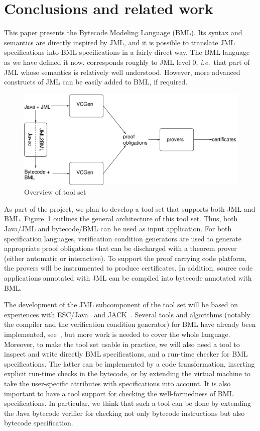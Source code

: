 \section{Conclusions and related work}\label{SecConcl}

This paper presents the Bytecode Modeling Language (BML). Its syntax
and semantics are directly inspired by JML, and it is possible to
translate JML specifications into BML specifications in a fairly
direct way. The BML language as we have defined it now, corresponds
roughly to JML level 0, \emph{i.e.}\ that part of JML whose semantics
is relatively well understood. However, more advanced constructs of
JML can be easily added to BML, if required. 

\begin{figure}[t]
\includegraphics[width=\textwidth]{toolset.eps} 
\caption{Overview of \mobius tool set}\label{FigToolSet}
\end{figure}
As part of the \mobius project, we plan to develop a tool set that
supports both JML and BML. Figure~\ref{FigToolSet} outlines the
general architecture of this tool set. Thus, both Java/JML and
bytecode/BML can be used as input application. For both specification
languages, verification condition generators are used to generate
appropriate proof obligations that can be discharged with a theorem
prover (either automatic or interactive). To support the proof
carrying code platform, the provers will be instrumented to produce
certificates. In addition, source code applications annotated with JML
can be compiled into bytecode annotated with BML.

The development of the JML subcomponent of the tool set will be based
on experiences with ESC/Java~\cite{CokK04} and JACK~\cite{BurdyRL03}.
Several tools and algorithms (notably the compiler and the
verification condition generator) for BML have already been
implemented, see~\cite{BurdyP06}, but more work is needed to cover the
whole language. Moreover, to make the tool set usable in practice, we
will also need a tool to inspect and write directly BML
specifications, and a run-time checker for BML specifications. The
latter can be implemented by a code transformation, inserting explicit
run-time checks in the bytecode, or by extending the virtual machine
to take the user-specific attributes with specifications into account.
It is also important to have a tool support for checking the well-formedness
of BML specifications. In particular, we think that such a tool 
can be done by extending the Java bytecode verifier for checking not
only bytecode instructions but also bytecode specification.

